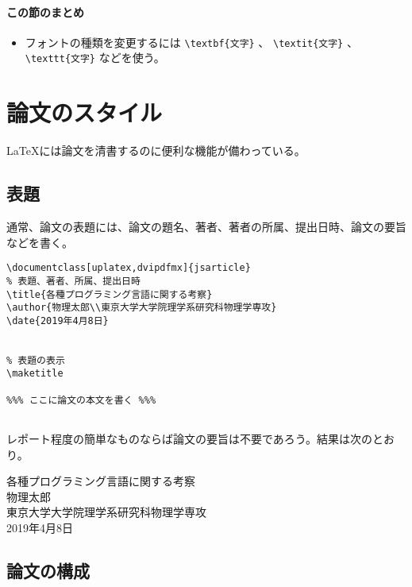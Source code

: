 \paragraph{この節のまとめ}

\begin{itemize}
    \item フォントの種類を変更するには \verb|\textbf{文字}| 、 \verb|\textit{文字}| 、\verb|\texttt{文字}| などを使う。
\end{itemize}


\section{論文のスタイル}
\label{sec:latex:style}

\LaTeX には論文を清書するのに便利な機能が備わっている。

\subsection{表題}
\label{sec:latex:title}

通常、論文の表題には、論文の題名、著者、著者の所属、提出日時、論文の要旨などを書く。
\begin{reidai}
    \begin{verbatim}
\documentclass[uplatex,dvipdfmx]{jsarticle}
% 表題、著者、所属、提出日時
\title{各種プログラミング言語に関する考察}
\author{物理太郎\\東京大学大学院理学系研究科物理学専攻}
\date{2019年4月8日}


% 表題の表示
\maketitle

%%% ここに論文の本文を書く %%%


\end{verbatim}
\end{reidai} \noindent
レポート程度の簡単なものならば論文の要旨は不要であろう。結果は次のとおり。
\begin{kekka}
    \centering
    {\Large 各種プログラミング言語に関する考察} \\[1.5em]
    物理太郎\\
    東京大学大学院理学系研究科物理学専攻 \\
    2019年4月8日
\end{kekka}

\subsection{論文の構成}
\label{sec:latex:section}

